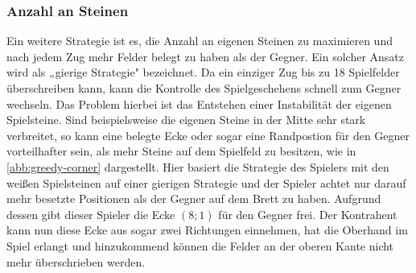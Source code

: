 \documentclass[12pt,a4paper,bibliography=totocnumbered,listof=totocnumbered]{article}
\begin{document}
\subsubsection{Anzahl an Steinen}
Ein weitere Strategie ist es, die Anzahl an eigenen Steinen zu maximieren und nach jedem Zug mehr Felder belegt zu haben als der Gegner. Ein solcher Ansatz wird als „gierige Strategie" bezeichnet. Da ein einziger Zug bis zu 18 Spielfelder überschreiben kann, kann die Kontrolle des Spielgeschehens schnell zum Gegner wechseln. Das Problem hierbei ist das Entstehen einer Instabilität der eigenen Spielsteine. Sind beispielsweise die eigenen Steine in der Mitte sehr stark verbreitet, so kann eine belegte Ecke oder sogar eine Randpostion für den Gegner vorteilhafter sein, als mehr Steine auf dem Spielfeld zu besitzen, wie in \autoref{abb:greedy-corner} dargestellt. Hier basiert die Strategie des Spielers mit den weißen Spielsteinen auf einer gierigen Strategie und der Spieler achtet nur darauf mehr besetzte Positionen als der Gegner auf dem Brett zu haben. Aufgrund dessen gibt dieser Spieler die Ecke $(8;1)$ für den Gegner frei. Der Kontrahent kann nun diese Ecke aus sogar zwei Richtungen einnehmen, hat die Oberhand im Spiel erlangt und hinzukommend können die Felder an der oberen Kante nicht mehr überschrieben werden.
\end{document}
